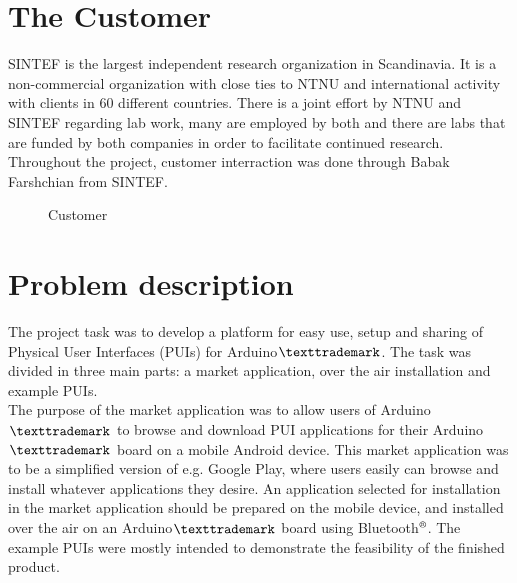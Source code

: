 \section{The Customer}
SINTEF is the largest independent research organization in Scandinavia. It is a non-commercial organization with close ties to NTNU and international activity with clients in 60 different countries. There is a joint effort by NTNU and SINTEF regarding lab work, many are employed by both and there are labs that are funded by both companies in order to facilitate continued research. \\
\newline
Throughout the project, customer interraction was done through Babak Farshchian from SINTEF.\\
\begin{figure}[H]
%
\hfill
{}%
\caption{Customer}
\end{figure}

\section{Problem description}
The project task was to develop a platform for easy use, setup and sharing of Physical User Interfaces (PUIs) for Arduino$\texttrademark$. The task was divided in three main parts: a market application, over the air installation and example PUIs.\\
\newline
The purpose of the market application was to allow users of Arduino$\texttrademark$ to browse and download PUI applications for their Arduino$\texttrademark$ board on a mobile Android device. This market application was to be a simplified version of e.g. Google Play, where users easily can browse and install whatever applications they desire. An application selected for installation in the market application should be prepared on the mobile device, and installed over the air on an Arduino$\texttrademark$ board using Bluetooth$\textsuperscript{\textregistered}$. The example PUIs were mostly intended to demonstrate the feasibility of the finished product.

